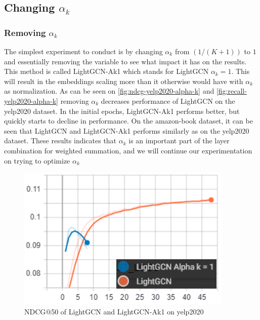 \subsection{Changing $\alpha_k$}

\subsubsection{Removing $\alpha_k$}\label{subsubsec:remove-alpha-k}
The simplest experiment to conduct is by changing $\alpha_k$ from $(1 / (K + 1))$ to $1$ and essentially removing the variable to see what impact it has on the results.
This method is called LightGCN-Ak1 which stands for LightGCN $\alpha_k = 1$.
This will result in the embeddings scaling more than it otherwise would have with $\alpha_k$ as normalization.
As can be seen on \autoref{fig:ndcg-yelp2020-alpha-k} and \autoref{fig:recall-yelp2020-alpha-k} removing $\alpha_k$ decreases performance of LightGCN on the yelp2020 dataset.
In the initial epochs, LightGCN-Ak1 performs better, but quickly starts to decline in performance.
On the amazon-book dataset, it can be seen that LightGCN and LightGCN-Ak1 performs similarly as on the yelp2020 dataset.
These results indicates that $\alpha_k$ is an important part of the layer combination for weighted summation, and we will continue our experimentation on trying to optimize $\alpha_k$
\begin{figure}
    \includegraphics[width=\linewidth]{figures/alpha-k-results/yelp2020-ndcg.png}
    \caption{NDCG@50 of LightGCN and LightGCN-Ak1 on yelp2020}
    \label{fig:ndcg-yelp2020-alpha-k}
\end{figure}
